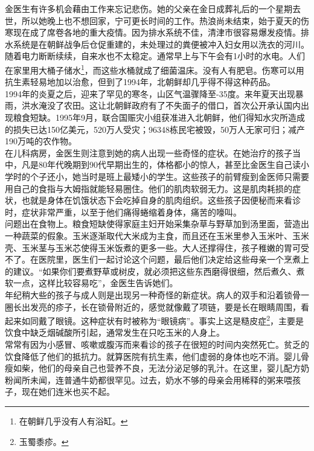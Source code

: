 \begin{multicols}{\theparacolNo}
金医生有许多机会藉由工作来忘记悲伤。她的父亲在金日成葬礼后的一个星期去世，所以她晚上也不想回家，宁可更长时间的工作。热浪尚未结束，始于夏天的伤寒现在成了席卷各地的重大疫情。因为排水系统不佳，清津市很容易爆发疫情。排水系统是在朝鲜战争后仓促重建的，未处理过的粪便被冲入妇女用以洗衣的河川。随着电力断断续续，自来水也不太稳定。通常早上与下午会有1小时的水电。人们在家里用大桶子储水\footnote{在朝鲜几乎没有人有浴缸。}，而这些水桶就成了细菌温床。没有人有肥皂。伤寒可以用抗生素轻易地加以治愈，但到了1994年，北朝鲜却几乎得不得这种药品。\\

1994年的炎夏之后，迎来了罕见的寒冬，山区气温骤降至-35度。来年夏天出现暴雨，洪水淹没了农田。这让北朝鲜政府有了不失面子的借口，首次公开承认国内出现粮食短缺。1995年9月，联合国赈灾小组获准进入北朝鲜，他们得知水灾所造成的损失已达150亿美元，520万人受灾；96348栋民宅被毁，50万人无家可归；减产190万吨的农作物。\\

在儿科病房，金医生则注意到她的病人出现一些奇怪的症状。在她治疗的孩子当中，凡是80年代晚期到90代早期出生的，体格都小的惊人，甚至比金医生自己读小学时的个子还小，她当时是班上最矮小的学生。这些孩子的前臂瘦到金医师只需要用自己的食指与大姆指就能轻易圈住。他们的肌肉软弱无力。这是肌肉耗损的症状，也就是身体在饥饿状态下会吃掉自身的肌肉组织。这些孩子因便秘而来看诊时，症状非常严重，以至于他们痛得蜷缩着身体，痛苦的嚎叫。\\

问题出在食物上。粮食短缺使得家庭主妇开始采集杂草与野草加到汤里面，营造出一种蔬菜的假象。玉米逐渐取代大米成为主食，而且还在玉米里参入玉米叶、玉米壳、玉米茎与玉米芯使得玉米饭煮的更多一些。大人还撑得住，孩子稚嫩的胃可受不了。在医院里，医生们一起讨论这个问题，最后他们决定给这些母亲一个烹煮上的建议。“如果你们要煮野草或树皮，就必须把这些东西磨得很细，然后煮久、煮软一点，这样比较容易吃”，金医生告诉她们。\\

年纪稍大些的孩子与成人则是出现另一种奇怪的新症状。病人的双手和沿着锁骨一圈长出发亮的疹子，长在锁骨附近的，感觉就像戴了项链，要是长在眼睛周围，看起来如同戴了眼镜。这种症状有时被称为“眼镜病”。事实上这是糙皮症\footnote{玉蜀黍疹。}，主要是饮食中缺乏烟碱酸所引起，通常发生在只吃玉米的人身上。\\

常常有因为小感冒、咳嗽或腹泻而来看诊的孩子在很短的时间内突然死亡。贫乏的饮食降低了他们的抵抗力。就算医院有抗生素，他们虚弱的身体也吃不消。婴儿骨瘦如柴，他们的母亲自己也营养不良，无法分泌足够的乳汁。在这里，婴儿配方奶粉闻所未闻，连普通牛奶都很罕见。过去，奶水不够的母亲会用稀释的粥来喂孩子，现在她们连米也买不起。\\


\end{multicols}
